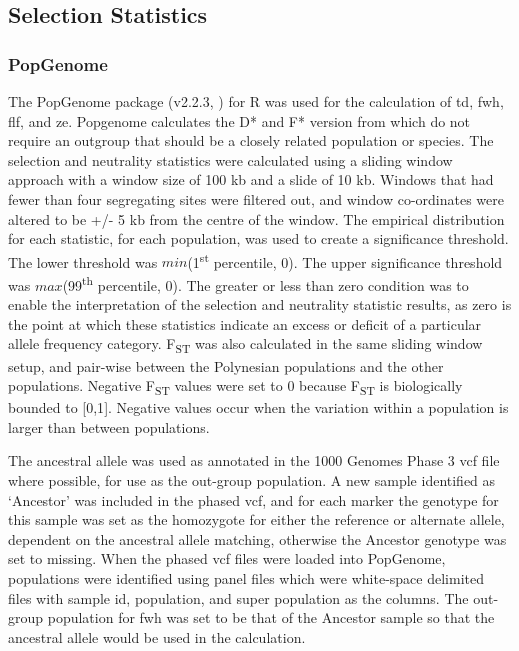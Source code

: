 \documentclass[]{report}
\begin{document}
\subsection{Selection Statistics}\label{selection-statistics}

\subsubsection{PopGenome}\label{popgenomeMethods}

The PopGenome package (v2.2.3, \citet{Pfeifer2014}) for R was used for
the calculation of \gls{td}, \gls{fwh}, \gls{flf}, and \gls{ze}.
Popgenome calculates the D* and F* version from \citet{Fu1993} which do
not require an outgroup that should be a closely related population or
species. The selection and neutrality statistics were calculated using a
sliding window approach with a window size of 100 kb and a slide of 10
kb. Windows that had fewer than four segregating sites were filtered
out, and window co-ordinates were altered to be +/- 5 kb from the centre
of the window. The empirical distribution for each statistic, for each
population, was used to create a significance threshold. The lower
threshold was \(min\)(1\textsuperscript{st} percentile, 0). The upper
significance threshold was \(max\)(99\textsuperscript{th} percentile,
0). The greater or less than zero condition was to enable the
interpretation of the selection and neutrality statistic results, as
zero is the point at which these statistics indicate an excess or
deficit of a particular allele frequency category. F\textsubscript{ST}
was also calculated in the same sliding window setup, and pair-wise
between the Polynesian populations and the other populations. Negative
F\textsubscript{ST} values were set to 0 because F\textsubscript{ST} is
biologically bounded to {[}0,1{]}. Negative values occur when the
variation within a population is larger than between populations.

The ancestral allele was used as annotated in the 1000 Genomes Phase 3
\gls{vcf} file where possible, for use as the out-group population. A
new sample identified as `Ancestor' was included in the phased
\gls{vcf}, and for each marker the genotype for this sample was set as
the homozygote for either the reference or alternate allele, dependent
on the ancestral allele matching, otherwise the Ancestor genotype was
set to missing. When the phased \gls{vcf} files were loaded into
PopGenome, populations were identified using panel files which were
white-space delimited files with sample id, population, and super
population as the columns. The out-group population for \gls{fwh} was
set to be that of the Ancestor sample so that the ancestral allele would
be used in the calculation.
\end{document}
